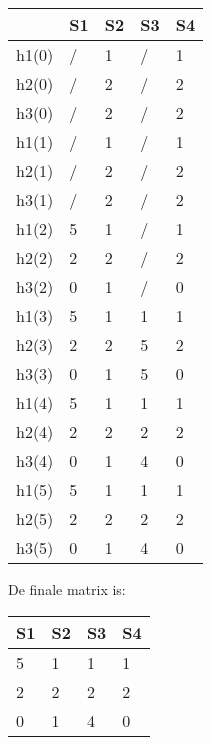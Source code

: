 \documentclass{exam}
\begin{document}
\begin{questions}
\begin{center}
    \begin{tabular}{| l | l | l | l | l |}
    \hline
	 & S1 & S2 & S3 & S4  \\ \hline
     h1(0) & / & 1 & / & 1\\ \hline
     h2(0) & / & 2 & / & 2\\ \hline
     h3(0) & / & 2 & / & 2\\ \hline\hline
     
      h1(1) & / & 1 & / & 1\\ \hline
     h2(1) & / & 2 & / & 2\\ \hline
     h3(1) & / & 2 & / & 2\\ \hline\hline
     
        h1(2) & 5 & 1 & / & 1\\ \hline
     h2(2) & 2 & 2 & / & 2\\ \hline
     h3(2) & 0 & 1 & / & 0\\ \hline\hline
     
      h1(3) & 5 & 1 & 1 & 1\\ \hline
     h2(3) & 2 & 2 & 5 & 2\\ \hline
     h3(3) & 0 & 1 & 5 & 0\\ \hline\hline
     
       h1(4) & 5 & 1 & 1 & 1\\ \hline
     h2(4) & 2 & 2 & 2 & 2\\ \hline
     h3(4) & 0 & 1 & 4 & 0\\ \hline\hline
     
       h1(5) & 5 & 1 & 1 & 1\\ \hline
     h2(5) & 2 & 2 & 2 & 2\\ \hline
     h3(5) & 0 & 1 & 4 & 0\\ \hline
    \end{tabular}
\end{center}
 
De finale matrix is: 

\begin{center}
    \begin{tabular}{| l | l | l | l |}
    \hline
	 S1 & S2 & S3 & S4  \\ \hline
     5 & 1 & 1 & 1 \\ \hline
     2 & 2 & 2 & 2 \\ \hline
     0 & 1 & 4 & 0 \\ \hline
    \end{tabular}
\end{center}


\end{questions}
\end{document}
